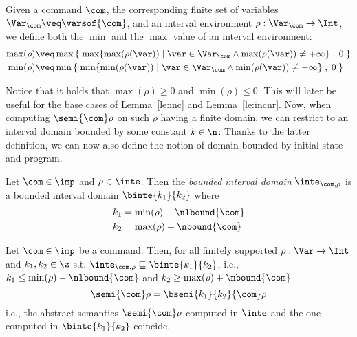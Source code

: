 \begin{definition}\label{def:minmax}
  Given a command \(\com\), the corresponding finite set of variables
  \(\Var_{\com} \veq \varsof{\com}\), and an interval environment
  \(\rho : \Var_{\com} \to \Int\), we define both the \(\min\) and the
  \(\max\) value of an interval environment:
  \begin{align*}
    \max(\rho) & \veq \max\left\{\; \max \{ \max(\rho(\var)) \mid \var \in \Var_{\com} \land \max(\rho(\var)) \neq + \infty\} \; , \; 0 \; \right\} \\
    \min(\rho) & \veq \min\left\{\; \min \{ \min(\rho(\var)) \mid \var \in \Var_{\com} \land \min(\rho(\var)) \neq - \infty\} \; , \; 0 \; \right\}
  \end{align*}
\end{definition}
% 
Notice that it holds that \(\max(\rho) \geq 0\) and
\(\min(\rho) \leq 0\). This will later be useful for the base cases of
Lemma~\ref{le:inc} and Lemma~\ref{le:incnr}.  Now, when computing
\(\semi{\com} \rho\) on such \(\rho\) having a finite domain,
we can restrict to an interval domain bounded by some constant
\(k\in\n\):
Thanks to the latter definition, we can now also define the
notion of domain bounded by initial state and program.

\begin{definition}\label{def:boundedbycom}
  Let \(\com\in\imp\) and \(\rho \in \inte\). Then the \emph{bounded
    interval domain} \(\inte_{\com,\rho}\) is a bounded interval
  domain \(\binte{k_1}{k_2}\) where
  \begin{align*}
    k_1 & = \min(\rho) - \nlbound{\com} \\
    k_2 & = \max(\rho) + \nbound{\com}
  \end{align*}
\end{definition}
\begin{theorem}\label{th:bounded}
  Let \(\com\in \imp\) be a command. Then, for all finitely supported
  \(\rho : \Var \to \Int\) and \(k_1, k_2\in \z\) s.t.
  \(\inte_{\com,\rho} \sqsubseteq \binte{k_1}{k_2}\), i.e.,
  \(k_1 \leq \min(\rho) - \nlbound{\com}\) and
  \(k_2 \geq \max(\rho) + \nbound{\com}\)
  \begin{equation}\label{eq:equal}
    \semi{\com}\rho = \bsemi{k_1}{k_2}{\com}\rho
  \end{equation}
  i.e., the abstract semantics \(\semi{\com} \rho\)
  computed in \(\inte\) and the one computed in \(\binte{k_1}{k_2}\)
  coincide.
\end{theorem}

